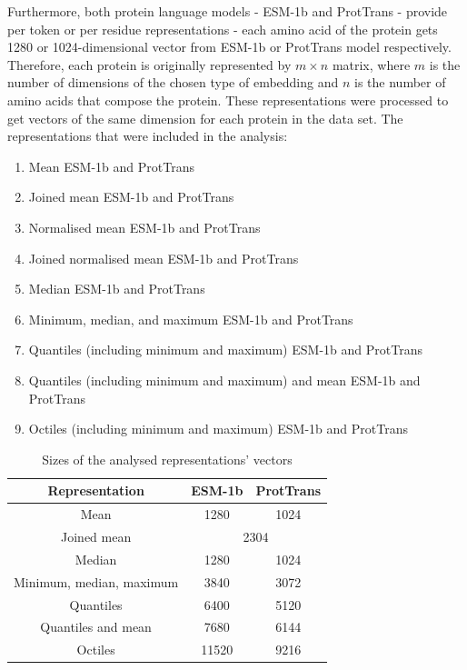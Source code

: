 \documentclass[12pt]{article}
\begin{document}
	Furthermore, both protein language models - ESM-1b and 
	ProtTrans - provide 
	per token or per residue representations - each 
	amino acid of the protein gets 1280 or 1024-dimensional vector from
	ESM-1b or ProtTrans model respectively. Therefore, each protein is 
	originally represented by ${m \times n}$ matrix, 
	where ${m}$ is the number of dimensions of the chosen type of embedding
	and ${n}$ is the number of amino acids that compose the protein. 
	These representations were processed to get vectors of the same dimension 
	for each protein in the data set. The representations 
	that were included in the analysis:

	\begin{enumerate}
		\item Mean ESM-1b and ProtTrans 
		\item Joined mean ESM-1b and ProtTrans
		\item Normalised mean ESM-1b and ProtTrans
		\item Joined normalised mean ESM-1b and ProtTrans
		\item Median ESM-1b and ProtTrans
		\item Minimum, median, and maximum ESM-1b and ProtTrans
		\item Quantiles (including minimum and maximum) ESM-1b and ProtTrans
		\item Quantiles (including minimum and maximum) and mean ESM-1b and ProtTrans
		\item Octiles (including minimum and maximum) ESM-1b and ProtTrans
	\end{enumerate}

	\begin{table}[h!]
		\caption{Sizes of the analysed representations' vectors}
		\vspace{0.2cm}
		\centering
		\begin{tabular}{ | c | c c | }
			\hline 
			Representation & ESM-1b & ProtTrans \\
			\hline 
			Mean & 1280 & 1024 \\
			Joined mean & \multicolumn{2}{c|}{2304} \\
			Median & 1280 & 1024 \\
			Minimum, median, maximum & 3840 & 3072 \\
			Quantiles & 6400 & 5120 \\
			Quantiles and mean & 7680 & 6144 \\
			Octiles & 11520 & 9216 \\
			\hline    
		\end{tabular}
		\label{table:vectorsDimensions}
	\end{table}
\end{document}
